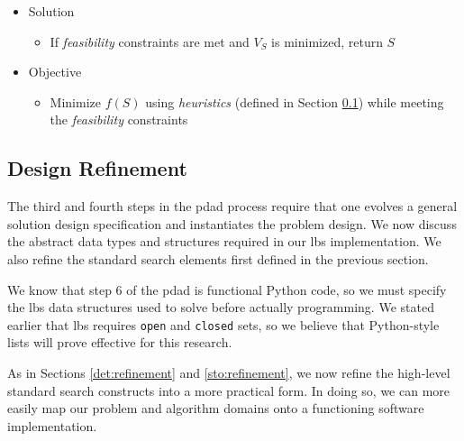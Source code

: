 \documentclass[../main.tex]{subfiles}
\begin{document}
\begin{itemize}
    \pagebreak

    \item Solution
    \begin{itemize}
        \item If \textit{feasibility} constraints are met and $V_S$ is minimized, return $S$
    \end{itemize}

    \item Objective
    \begin{itemize}
        \item Minimize $f(S)$ using \textit{heuristics} (defined in Section \ref{loc:refinement}) while meeting the \textit{feasibility} constraints
    \end{itemize}
\end{itemize}

\subsection{Design Refinement}\label{loc:refinement}

The third and fourth steps in the \acl{pdad} process require that one evolves a general solution design specification and instantiates the problem design. We now discuss the abstract data types and structures required in our \ac{lbs} implementation. We also refine the standard search elements first defined in the previous section.

We know that step 6 of the \ac{pdad} is functional Python code, so we must specify the \ac{lbs} data structures used to solve \probs before actually programming. We stated earlier that \ac{lbs} requires \texttt{open} and \texttt{closed} sets, so we believe that Python-style lists will prove effective for this research. 

As in Sections \ref{det:refinement} and \ref{sto:refinement}, we now refine the high-level standard search constructs into a more practical form. In doing so, we can more easily map our problem and algorithm domains onto a functioning software implementation.
\end{document}
